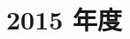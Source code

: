 \documentclass[../../hsm_tok_a.tex]{subfiles}
\begin{document}
    \section{2015 年度}

    

    \clearpage

    
\end{document}
